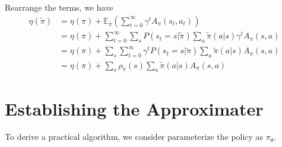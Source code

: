 Rearrange the terms, we have
\begin{align*}
\eta(\tilde{\pi})&=\eta(\pi)+\mathbb{E}_{\tilde{\pi}}(\sum_{t=0}^{\infty}\gamma^{t}A_{\pi}(s_{t},a_{t}))\\
&=\eta(\pi)+\sum_{t=0}^{\infty}\sum_{s}P(s_{t}=s|\tilde{\pi})\sum_{a}\tilde{\pi}(a|s)\gamma^{t}A_{\pi}(s,a)\\
&=\eta(\pi)+\sum_{s}\sum_{t=0}^{\infty}\gamma^{t}P(s_{t}=s|\tilde{\pi})\sum_{a}\tilde{\pi}(a|s)A_{\pi}(s,a)\\
&=\eta(\pi)+\sum_{s}\rho_{\tilde{\pi}}(s)\sum_{a}\tilde{\pi}(a|s)A_{\pi}(s,a)
\end{align*}

\section{Establishing the Approximater}
To derive a practical algorithm, we consider parameterize the policy as $\pi_{\theta}$. 

